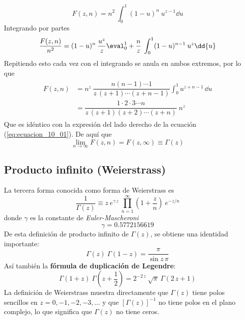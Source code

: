 \begin{equation}
F(z,n) = n^{2} \: \int_{0}^{1} (1-u)^{n} \: u^{z-1} \dd{u}
\label{eq:ecuacion_10_12}
\end{equation}
Integrando por partes
\begin{equation}
\dfrac{F(z, n)}{n^{2}} =  (1-u)^{n} \: \dfrac{u^{z}}{z} \eval_{0}^{1} + \dfrac{n}{z} \: \int_{0}^{1} (1-u)^{n-1} \: u^{z} \dd{u}
\label{eq:ecuacion_10_13}
\end{equation}
Repitiendo esto cada vez con el integrando se anula en ambos extremos, por lo que
\begin{align}
\begin{aligned}
F(z,n) &= n^{z} \: \dfrac{n(n-1) \cdots 1}{z \, (z+1) \cdots (z+n-1)} \int_{0}^{1} u^{z+n-1} \, \dd{u} \\
&= \dfrac{1 \cdot 2 \cdot 3 \cdots n}{z \, (z+1)(z+2) \cdots (z+n)} \: n^{z}
\label{eq:ecuacion_10_14}
\end{aligned}
\end{align}
Que es idéntico con la expresión del lado derecho de la ecuación (\ref{eq:ecuacion_10_01}). De aquí que
\begin{equation}
\lim_{n \to \infty} F(z, n) = F(z, \infty) \equiv \Gamma (z)
\label{eq:ecuacion_10_15}
\end{equation}
\subsection{Producto infinito (Weierstrass)}
La tercera forma conocida como forma de Weierstrass es
\begin{equation}
\dfrac{1}{\Gamma (z)} \equiv z \:  e^{\gamma \, z} \: \prod_{n=1}^{\infty} \left( 1 + \dfrac{z}{n} \right) \: e^{-z/n}
\label{eq:ecuacion_10_16}
\end{equation}
donde $\gamma$ es la constante de \emph{Euler-Mascheroni}
\begin{equation}
\gamma = 0.5772156619
\label{eq:ecuacion_10_17}
\end{equation}
De esta definición de producto infinito de $\Gamma (z)$, se obtiene una identidad importante:
\begin{equation}
\Gamma (z) \: \Gamma (1 - z) = \dfrac{\pi}{\sin z \, \pi}
\label{eq:ecuacion_10_23}
\end{equation}
Así también la \textbf{fórmula de duplicación de Legendre}:
\begin{equation}
\Gamma (1 + z) \: \Gamma (z + \frac{1}{2}) = 2^{-2 \, z} \: \sqrt{\pi} \: \Gamma (2 \, z + 1)
\label{eq:ecuacion_10_24b}
\end{equation}
La definición de Weierstrass muestra directamente que $\Gamma (z)$ tiene polos sencillos en $z = 0, -1, -2, -3, \ldots$ y que $[\Gamma (z)]^{-1}$ no tiene polos en el plano complejo, lo que significa que $\Gamma (z)$ no tiene ceros.
